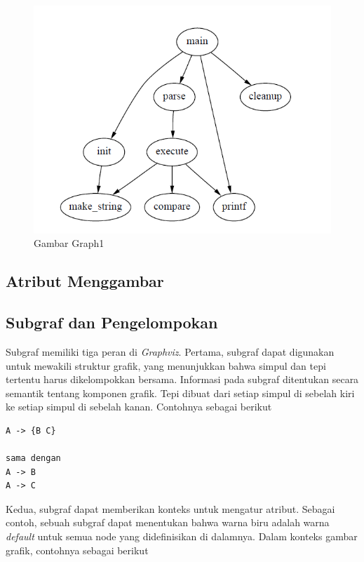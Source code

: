 \begin{figure}[H]
		\centering
		\includegraphics[scale = 0.5]{graph1.png}
		\caption{Gambar Graph1}
		\label{}
\end{figure}	

\subsection{Atribut Menggambar}
\label{sec: Atribut Menggambar}


\subsection{Subgraf dan Pengelompokan}
\label{sec: Subgraf dan Pengelompokan}
Subgraf memiliki tiga peran di \textit{Graphviz}. Pertama, subgraf dapat digunakan untuk mewakili struktur grafik, yang menunjukkan bahwa simpul dan tepi tertentu harus dikelompokkan bersama. Informasi pada subgraf ditentukan secara semantik tentang komponen grafik. Tepi dibuat dari setiap simpul di sebelah kiri ke setiap simpul di sebelah kanan. Contohnya sebagai berikut 
\begin{lstlisting}
A -> {B C} 

sama dengan
A -> B
A -> C
\end{lstlisting}

Kedua, subgraf dapat memberikan konteks untuk mengatur atribut. Sebagai contoh, sebuah subgraf dapat menentukan bahwa warna biru adalah warna \textit{default} untuk semua node yang didefinisikan di dalamnya. Dalam konteks gambar grafik, contohnya sebagai berikut

